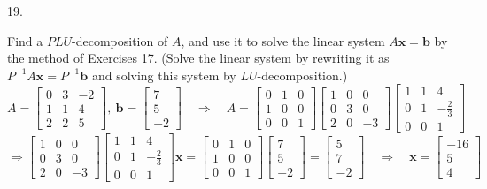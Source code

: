 \documentclass[12pt]{book}
\begin{document}
\begin{CJK}{UTF8}{bsmi}
19. \begin{minipage}[t]{\dimexpr\linewidth-2em}
Find a $PLU$-decomposition of $A$, and use it to solve the linear system $A\textbf{x}=\textbf{b}$ by the method of Exercises 17. (Solve the linear system by rewriting it as $P^{-1}A\textbf{x}=P^{-1}\textbf{b}$ and solving this system by $LU$-decomposition.) $A=\begin{bmatrix}
0 & 3 & -2 \\
1 & 1 &  4 \\
2 & 2 &  5
\end{bmatrix},\ \textbf{b}=\begin{bmatrix}
7 \\ 5 \\ -2
\end{bmatrix}\quad\Rightarrow\quad A=\begin{bmatrix}
0 & 1 & 0 \\
1 & 0 & 0 \\
0 & 0 & 1
\end{bmatrix}\begin{bmatrix}
1 & 0 & 0 \\
0 & 3 & 0 \\
2 & 0 &-3
\end{bmatrix}\begin{bmatrix}
1 & 1 & 4 \\
0 & 1 & -\frac{2}{3} \\
0 & 0 & 1
\end{bmatrix}$ \\
$\Rightarrow\begin{bmatrix}
1 & 0 & 0 \\
0 & 3 & 0 \\
2 & 0 &-3
\end{bmatrix}\begin{bmatrix}
1 & 1 & 4 \\
0 & 1 & -\frac{2}{3} \\
0 & 0 & 1
\end{bmatrix}\textbf{x}=\begin{bmatrix}
0 & 1 & 0 \\
1 & 0 & 0 \\
0 & 0 & 1
\end{bmatrix}\begin{bmatrix}
7 \\ 5 \\ -2
\end{bmatrix}=\begin{bmatrix}
5 \\ 7 \\ -2
\end{bmatrix}\quad\Rightarrow\quad\textbf{x}=\begin{bmatrix}
-16 \\ 5 \\ 4
\end{bmatrix}$
\end{minipage}\\


\end{CJK}
\end{document}

